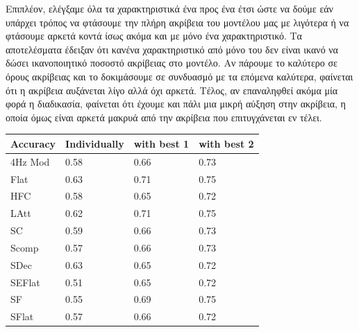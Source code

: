 Eπιπλέον, ελέγξαμε όλα τα χαρακτηριστικά ένα προς ένα έτσι ώστε να δούμε εάν υπάρχει τρόπος να φτάσουμε την πλήρη ακρίβεια του μοντέλου μας με λιγότερα ή να φτάσουμε αρκετά κοντά ίσως ακόμα και με μόνο ένα χαρακτηριστικό. 
Tα αποτελέσματα έδειξαν ότι κανένα χαρακτηριστικό από μόνο του δεν είναι ικανό να δώσει ικανοποιητικό ποσοστό ακρίβειας στο μοντέλο. Αν πάρουμε το καλύτερο σε όρους ακρίβειας και το δοκιμάσουμε σε συνδυασμό με τα επόμενα καλύτερα, φαίνεται ότι η ακρίβεια αυξάνεται λίγο αλλά όχι αρκετά.  
Τέλος, αν επαναληφθεί ακόμα μία φορά η διαδικασία, φαίνεται ότι έχουμε και πάλι μια μικρή αύξηση στην ακρίβεια, η οποία όμως είναι αρκετά μακρυά από την ακρίβεια που επιτυγχάνεται εν τέλει. 

\begin{table}[H]
\begin{tabular}{|l|l|l|l|}
\hline
\textbf{Accuracy}       & \textbf{Individually}       & \textbf{with best 1}       & \textbf{with best 2}       \\\hline
4Hz Mod                 & 0.58                        & 0.66                       & 0.73                       \\\hline
Flat                    & 0.63                        & 0.71                       & 0.75                       \\\hline
HFC                     & 0.58                        & 0.65                       & 0.72                       \\\hline
LAtt                    & 0.62                        & 0.71                       & 0.75                       \\\hline
SC                      & 0.59                        & 0.66                       & 0.73                       \\\hline
Scomp                   & 0.57                        & 0.66                       & 0.73                       \\\hline
SDec                    & 0.63                        & 0.65                       & 0.72                       \\\hline
SEFlat                  & 0.51                        & 0.65                       & 0.72                       \\\hline
SF                      & 0.55                        & 0.69                       & 0.75                       \\\hline
SFlat                   & 0.57                        & 0.66                       & 0.72                       \\\hline

\end{tabular}
\end{table}
